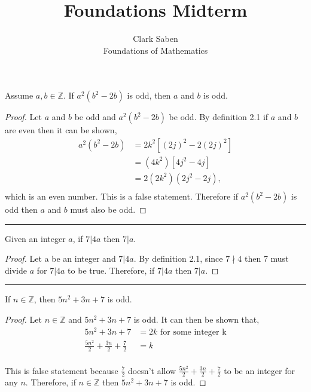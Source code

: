 \documentclass[12pt]{article}
\newenvironment{theorem}[2][Theorem]{\begin{trivlist}
\item[\hskip \labelsep {\bfseries #1}\hskip \labelsep {\bfseries #2.}]}{\end{trivlist}}
\begin{document}
 
 
\title{Foundations Midterm}%
\author{Clark Saben\\ %
Foundations of Mathematics} %
 
\maketitle

 
\begin{theorem}{1}
	Assume $a,b \in \mathbb{Z}$. If $a^2 \left(b^2 -2b \right)$ is odd, then $a$ and $b$ 
	is odd.
\end{theorem}
\begin{proof}
	Let $a$ and $b$ be odd and $a^2 \left(b^2 -2b \right)$ be odd. By definition 2.1
	if $a$ and $b$ are even then it can be shown,
	\begin{align*}
		{a^2 \left(b^2 -2b \right)} &= 2k^2 [\left(2j\right)^2 -2 \left(2j \right)^2] \\
					    &= \left(4k^2\right)[4j^2 - 4j]\\
					    &= 2  \left(2k^2\right) \left(2j^2 - 2j \right), \\
	\end{align*}
	which is an even number. This is a  false statement. Therefore if $a^2 \left(b^2 -2b \right)$ is odd then $a$ and $b$ must also
	be odd.
\end{proof}

\hrule

\begin{theorem}{2}
	Given an integer $a$, if $7|4a$ then $7|a$.
\end{theorem}
\begin{proof}
	Let a be an integer and $7|4a$. By definition 2.1, since $7\nmid4$ then 7 must
	divide $a$ for $7|4a$ to be true. Therefore, if $7|4a$ then $7|a$.
\end{proof}

\hrule

\begin{theorem}{3}
	If $n\in \mathbb{Z}$, then $5n^2 + 3n +7$ is odd.
\end{theorem}
\begin{proof}
	Let $n \in \mathbb{Z}$ and $5n^2 + 3n +7$ is odd. It can then be shown that,\\
	\begin{align}
		{5n^2 + 3n + 7 }&= 2k \text{ for some integer k}\\
		\frac{5n^2}{2} + \frac{3n}{2} + \frac{7}{2}&= k\\
	\end{align}

	This is false statement because $\frac{7}{2}$ doesn't allow 
	$\frac{5n^2}{2} + \frac{3n}{2} + \frac{7}{2}$ to be an integer
	for any $n$. Therefore, if $n \in \mathbb{Z}$ then $5n^2 + 3n +7$ is odd.
\end{proof}
\end{document}
